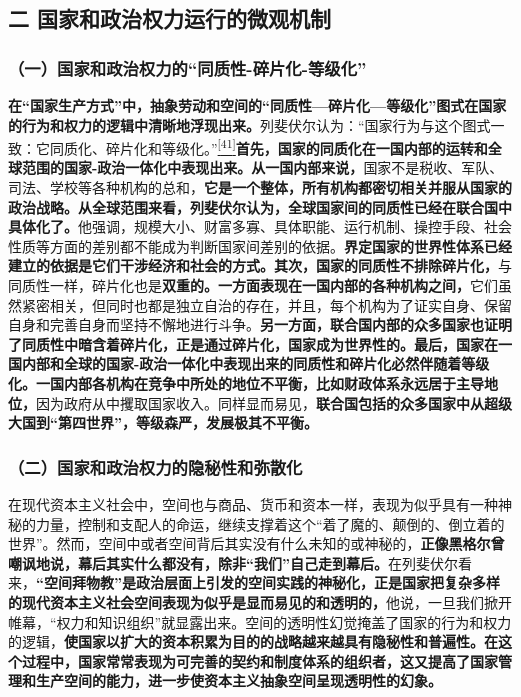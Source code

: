 \documentclass[UTF8, fontset = sourcesans, a4paper, oneside, zihao =
-4, scheme=chinese, no-math, space=true]{ctexbook}
\begin{document}
\subsection{二
国家和政治权力运行的微观机制}\label{part0007_split_002.htmlux5cux23c029}

\subsubsection{\texorpdfstring{（一）国家和政治权力的``同质性-碎片化-等级化''}{（一）国家和政治权力的同质性-碎片化-等级化}}\label{part0007_split_002.htmlux5cux23d014}

\textbf{在``国家生产方式''中，抽象劳动和空间的``同质性---碎片化---等级化''图式在国家的行为和权力的逻辑中清晰地浮现出来。}列斐伏尔认为：``国家行为与这个图式一致：它同质化、碎片化和等级化。''\protect\hypertarget{part0007_split_002.htmlux5cux23w41}{}{}\protect\hyperlink{part0007_split_004.htmlux5cux23m41}{\textsuperscript{{[}41{]}}}\textbf{首先，国家的同质化在一国内部的运转和全球范围的国家-政治一体化中表现出来。从一国内部来说，}国家不是税收、军队、司法、学校等各种机构的总和，\textbf{它是一个整体，所有机构都密切相关并服从国家的政治战略。从全球范围来看，列斐伏尔认为，全球国家间的同质性已经在联合国中具体化了。}他强调，规模大小、财富多寡、具体职能、运行机制、操控手段、社会性质等方面的差别都不能成为判断国家间差别的依据。\textbf{界定国家的世界性体系已经建立的依据是它们干涉经济和社会的方式。其次，国家的同质性不排除碎片化，}与同质性一样，碎片化也是\textbf{双重的。一方面表现在一国内部的各种机构之间，}它们虽然紧密相关，但同时也都是独立自治的存在，并且，每个机构为了证实自身、保留自身和完善自身而坚持不懈地进行斗争。\textbf{另一方面，联合国内部的众多国家也证明了同质性中暗含着碎片化，正是通过碎片化，国家成为世界性的。最后，国家在一国内部和全球的国家-政治一体化中表现出来的同质性和碎片化必然伴随着等级化。一国内部各机构在竞争中所处的地位不平衡，比如财政体系永远居于主导地位，}因为政府从中攫取国家收入。同样显而易见，\textbf{联合国包括的众多国家中从超级大国到``第四世界''，等级森严，发展极其不平衡。}

\subsubsection{（二）国家和政治权力的隐秘性和弥散化}\label{part0007_split_002.htmlux5cux23d015}

在现代资本主义社会中，空间也与商品、货币和资本一样，表现为似乎具有一种神秘的力量，控制和支配人的命运，继续支撑着这个``着了魔的、颠倒的、倒立着的世界''。然而，空间中或者空间背后其实没有什么未知的或神秘的，\textbf{正像黑格尔曾嘲讽地说，幕后其实什么都没有，除非``我们''自己走到幕后。}在列斐伏尔看来，\textbf{``空间拜物教''是政治层面上引发的空间实践的神秘化，正是国家把复杂多样的现代资本主义社会空间表现为似乎是显而易见的和透明的，}他说，一旦我们掀开帷幕，``权力和知识组织''就显露出来。空间的透明性幻觉掩盖了国家的行为和权力的逻辑，\textbf{使国家以扩大的资本积累为目的的战略越来越具有隐秘性和普遍性。在这个过程中，国家常常表现为可完善的契约和制度体系的组织者，这又提高了国家管理和生产空间的能力，进一步使资本主义抽象空间呈现透明性的幻象。}
\end{document}
